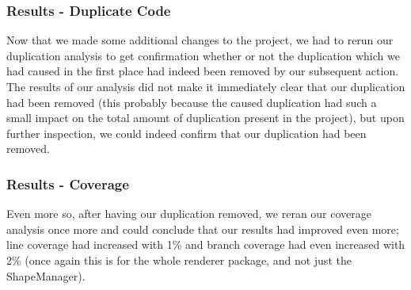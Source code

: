 \documentclass{article}
\begin{document}
\subsubsection{Results - Duplicate Code}

Now that we made some additional changes to the project, we had to rerun our duplication analysis to get confirmation whether or not the duplication which we had caused in the first place had indeed been removed by our subsequent action. The results of our analysis did not make it immediately clear that our duplication had been removed (this probably because the caused duplication had such a small impact on the total amount of duplication present in the project), but upon further inspection, we could indeed confirm that our duplication had been removed.

\subsubsection{Results - Coverage}

Even more so, after having our duplication removed, we reran our coverage analysis once more and could conclude that our results had improved even more; line coverage had increased with 1\% and branch coverage had even increased with 2\% (once again this is for the whole renderer package, and not just the ShapeManager).
\end{document}
